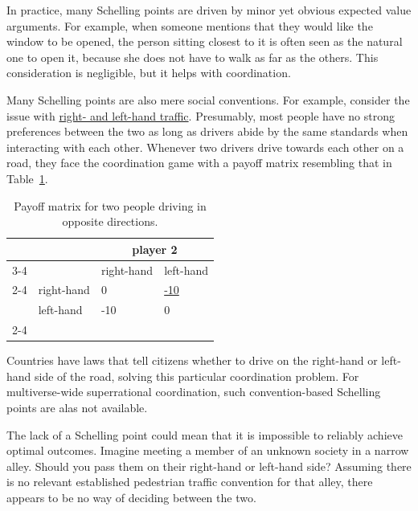 In practice, many Schelling points are driven by minor yet obvious
expected value arguments. For example, when someone mentions that they
would like the window to be opened, the person sitting closest to it is
often seen as the natural one to open it, because she does not have to
walk as far as the others. This consideration is negligible, but it
helps with coordination.

Many Schelling points are also mere social conventions. For example,
consider the issue with
\href{https://en.wikipedia.org/wiki/Right-_and_left-hand_traffic}{right-
and left-hand traffic}. Presumably, most people have no strong
preferences between the two as long as drivers abide by the same
standards when interacting with each other. Whenever two drivers drive
towards each other on a road, they face the coordination game with a
payoff matrix resembling that in Table~\ref{right-or-left-hand-traffic}.

\renewcommand{\arraystretch}{1.5}
\begin{table}[h!]
    \centering
    \begin{tabular}{p{1cm} p{2cm} p{2cm} p{2cm} }
        & & \multicolumn{2}{c}{player 2} \\
        \cmidrule[.2ex]{3-4}
         & & right-hand & left-hand\\
         \cmidrule[.1ex]{2-4}
        \multirow{2}{*}{player 1} & right-hand & 0 & \href{https://en.wikipedia.org/wiki/Wrong-way_driving}{-10}\\
        & left-hand & -10 & 0\\
        \cmidrule[.2ex]{2-4}
    \end{tabular}
    \caption{Payoff matrix for two people driving in opposite directions.}
    \label{right-or-left-hand-traffic}
\end{table}

Countries have laws that tell citizens whether to drive on the
right-hand or left-hand side of the road, solving this particular
coordination problem. For multiverse-wide superrational coordination,
such convention-based Schelling points are alas not available.

The lack of a Schelling point could mean that it is impossible to
reliably achieve optimal outcomes. Imagine meeting a member of an
unknown society in a narrow alley. Should you pass them on their
right-hand or left-hand side? Assuming there is no relevant established
pedestrian traffic convention for that alley, there appears to be no way
of deciding between the two.


